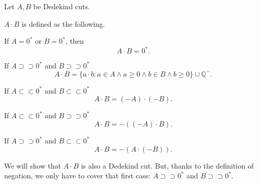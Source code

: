\documentclass[class=mike-apostol-mathematical-analysis,crop=false]{standalone}
\begin{document}
\begin{definition}[Multiplication]
    \par Let $A, B$ be Dedekind cuts.
    \par $A\cdot B$ is defined as the following.
    \par If $A = {0}^{*}$ or $B = {0}^{*}$, then
    \[
        A\cdot B = {0}^{*}.
    \]
    \par If $A\supset\supset{0}^{*}$ and $B\supset\supset{0}^{*}$
    \[
        A\cdot B = \{ a\cdot b : a\in A\wedge a\ge 0 \wedge b\in B\wedge b\ge 0 \} \cup \mathbb{Q}^{-}.
    \]
    \par If $A\subset\subset{0}^{*}$ and $B\subset\subset{0}^{*}$
    \[
        A\cdot B = (-A)\cdot (-B).
    \]
    \par If $A\subset\subset{0}^{*}$ and $B\supset\supset{0}^{*}$
    \[
        A\cdot B = -\left((-A)\cdot B\right).
    \]
    \par If $A\supset\supset{0}^{*}$ and $B\subset\subset{0}^{*}$
    \[
        A\cdot B = -\left(A\cdot (-B)\right).
    \]
\end{definition}

\par We will show that $A\cdot B$ is also a Dedekind cut. But, thanks to the definition of negation, we only have to cover that first case: $A\supset\supset{0}^{*}$ and $B\supset\supset{0}^{*}$.
\end{document}
